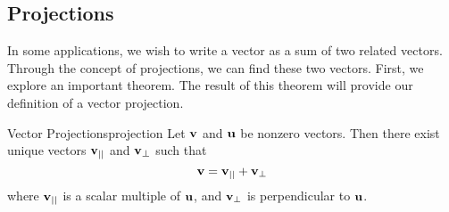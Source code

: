 \subsection{Projections}

In some applications, we wish to write a vector as a sum of two related vectors. Through the concept of projections, we can find these two vectors. First, we explore an important theorem. The result of 
this theorem will provide our definition of a vector projection.

\begin{theorem}{Vector Projections}{projection}
Let ${\bf v}$ and ${\bf u}$ be nonzero vectors. Then
there exist unique vectors ${\bf v}_{||}$ and ${\bf v}_{\bot }$ such
that
\begin{equation}
{\bf v}={\bf v}_{||}+{\bf v}_{\bot }  \label{projection}
\end{equation}
where ${\bf v}_{||}$ is a scalar multiple of ${\bf u}$, 
and ${\bf v}_{\bot}$ is perpendicular to ${\bf u}$.

\end{theorem}

